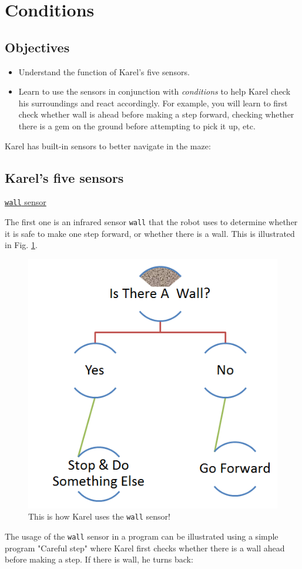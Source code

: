 
\section{Conditions} \label{sec:cond}

\subsection{Objectives} 

\begin{itemize}
\item Understand the function of Karel's five sensors.
\item Learn to use the sensors in conjunction with {\em conditions} to help Karel 
      check his surroundings and react accordingly. For example, you will learn to first 
      check whether wall is ahead before making a step forward, checking whether there
      is a gem on the ground before attempting to pick it up, etc.
\end{itemize}

\noindent
Karel has built-in sensors to better navigate in the maze:

\subsection{Karel's five sensors}

\noindent
\underline{{\tt wall} sensor}

The first one is an infrared sensor {\tt wall} that the robot uses to determine 
whether it is safe to make one step forward, or whether there is a wall. This is 
illustrated in Fig. \ref{fig:dede-ifelse}.

\begin{figure}[!ht]
\begin{center}
\includegraphics[height=0.5\textwidth]{imgk/salih-ifelse.png}
\end{center}
\vspace{-4mm}
\caption{This is how Karel uses the {\tt wall} sensor!}
\label{fig:dede-ifelse}
\end{figure}
\noindent
The usage of the {\tt wall} sensor in a program can be illustrated using a simple program "Careful step" 
where Karel first checks whether there is a wall ahead before
making a step. If there is wall, he turns back: 

